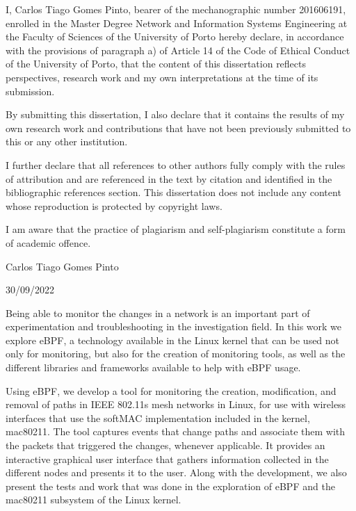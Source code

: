 
I, Carlos Tiago Gomes Pinto, bearer of the mechanographic number 201606191,
enrolled in the Master Degree Network and Information Systems Engineering at the
Faculty of Sciences of the University of Porto hereby declare, in accordance
with the provisions of paragraph a) of Article 14 of the Code of Ethical Conduct
of the University of Porto, that the content of this dissertation reflects
perspectives, research work and my own interpretations at the time of its
submission.

By submitting this dissertation, I also declare that it contains the results of
my own research work and contributions that have not been previously submitted
to this or any other institution.

I further declare that all references to other authors fully comply with the
rules of attribution and are referenced in the text by citation and identified
in the bibliographic references section. This dissertation does not include any
content whose reproduction is protected by copyright laws.

I am aware that the practice of plagiarism and self-plagiarism constitute a form
of academic offence.

Carlos Tiago Gomes Pinto

30/09/2022



Being able to monitor the changes in a network is an important part of
experimentation and troubleshooting in the investigation field. In this work we
explore eBPF, a technology available in the Linux kernel that can be used not
only for monitoring, but also for the creation of monitoring tools, as well as
the different libraries and frameworks available to help with eBPF usage.

Using eBPF, we develop a tool for monitoring the creation, modification, and
removal of paths in \ac{IEEE} 802.11s mesh networks in Linux, for use with
wireless interfaces that use the softMAC implementation included in the kernel,
mac80211. The tool captures events that change paths and associate them with the
packets that triggered the changes, whenever applicable. It provides an
interactive graphical user interface that gathers information collected in the
different nodes and presents it to the user. Along with the development, we also
present the tests and work that was done in the exploration of eBPF and the
mac80211 subsystem of the Linux kernel.


